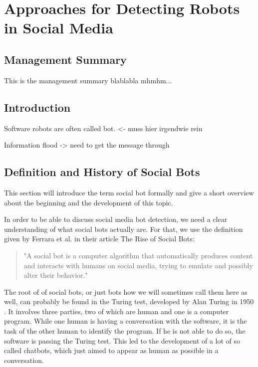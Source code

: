 \newpage
\chapter{Approaches for Detecting Robots \\ in Social Media}


\section*{Management Summary}
This is the management summary blablabla mhmhm...

\section{Introduction}
Software robots are often called bot. <- muss hier irgendwie rein 

Information flood -> need to get the message through

\section{Definition and History of Social Bots} 
This section will introduce the term social bot formally and give a short overview about the beginning and the development of this topic.

In order to be able to discuss social media bot detection, we need a clear understanding of what social bots actually are.  For that, we use the definition given by Ferrara et al. in their article The Rise of Social Bots:
\begin{quote}
	"A social bot is a computer algorithm that automatically produces content and interacts with humans on social media, trying to emulate and possibly alter their behavior." \cite{ferrara15}
\end{quote}

The root of of social bots, or just bots how we will sometimes call them here as well, can probably be found in the Turing test, developed by Alan Turing in 1950 \cite{turing}. It involves three parties, two of which are human and one is a computer program. While one human is having a conversation with the software, it is the task of the other human to identify the program. If he is not able to do so, the software is passing the Turing test. This led to the development of a lot of so called chatbots, which just aimed to appear as human as possible in a conversation.  


